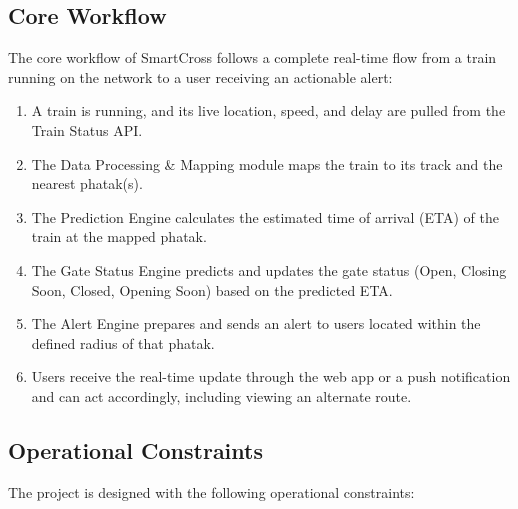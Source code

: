 \documentclass[11pt,a4paper]{article}
\begin{document}
\subsection{Core Workflow}

The core workflow of SmartCross follows a complete real-time flow from a train running on the network to a user receiving an actionable alert:

\begin{enumerate}
    \item A train is running, and its live location, speed, and delay are pulled from the Train Status API.

    \item The Data Processing \& Mapping module maps the train to its track and the nearest phatak(s).

    \item The Prediction Engine calculates the estimated time of arrival (ETA) of the train at the mapped phatak.

    \item The Gate Status Engine predicts and updates the gate status (Open, Closing Soon, Closed, Opening Soon) based on the predicted ETA.

    \item The Alert Engine prepares and sends an alert to users located within the defined radius of that phatak.

    \item Users receive the real-time update through the web app or a push notification and can act accordingly, including viewing an alternate route.
\end{enumerate}


\subsection{Operational Constraints}

The project is designed with the following operational constraints:
\end{document}
